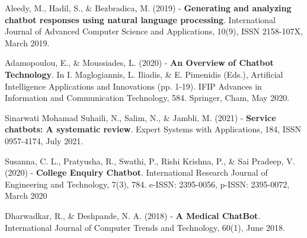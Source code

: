 \documentclass[12pt, twoside]{article}
\begin{document}
\begin{thebibliography}{24}


	Aleedy, M., Hadil, S., \& Bezbradica, M. (2019) - \textbf{Generating and analyzing chatbot responses using natural language processing}. International Journal of Advanced Computer Science and Applications, 10(9), ISSN 2158-107X, March 2019.

	 Adamopoulou, E., \& Moussiades, L. (2020) - \textbf{An Overview of Chatbot Technology}. In I. Maglogiannis, L. Iliadis, \& E. Pimenidis (Eds.), Artificial Intelligence Applications and Innovations (pp. 1-19). IFIP Advances in Information and Communication Technology, 584. Springer, Cham, May 2020.

	Sinarwati Mohamad Suhaili, N., Salim, N., \& Jambli, M. (2021) - \textbf{Service chatbots: A systematic review}. Expert Systems with Applications, 184, ISSN 0957-4174, July 2021.

	Susanna, C. L., Pratyusha, R., Swathi, P., Rishi Krishna, P., \& Sai Pradeep, V. (2020) - \textbf{College Enquiry Chatbot}. International Research Journal of Engineering and Technology, 7(3), 784. e-ISSN: 2395-0056, p-ISSN: 2395-0072, March 2020

	Dharwadkar, R., \& Deshpande, N. A. (2018) - \textbf{A Medical ChatBot}. International Journal of Computer Trends and Technology, 60(1), June 2018.

\end{thebibliography}
\end{document}
